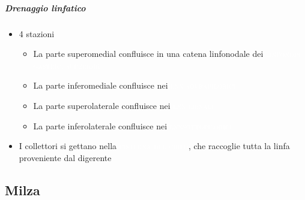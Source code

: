 \documentclass[italian,]{article}
\providecommand{\tightlist}{%
  \setlength{\itemsep}{0pt}\setlength{\parskip}{0pt}}
\newcommand{\lin}[1]{\colorbox{PineGreen}{\textcolor{white}{\textsc{#1}}}}
\begin{document}
\hypertarget{drenaggio-linfatico-1}{%
\subparagraph{Drenaggio linfatico}\label{drenaggio-linfatico-1}}

\begin{itemize}
\tightlist
\item
  4 stazioni

  \begin{itemize}
  \tightlist
  \item
    La parte superomedial confluisce in una catena linfonodale dei
    \lin{linfonodi gastrici superiori}
  \item
    La parte inferomediale confluisce nei \lin{lnn sovrapilorici}
  \item
    La parte superolaterale confluisce nei \lin{lnn lienali}
  \item
    La parte inferolaterale confluisce nei \lin{lnnsottopilorici}
  \end{itemize}
\item
  I collettori si gettano nella \lin{cisterna del chilo}, che raccoglie
  tutta la linfa proveniente dal digerente
\end{itemize}

\hypertarget{milza}{%
\subsection{Milza}\label{milza}}
\end{document}
